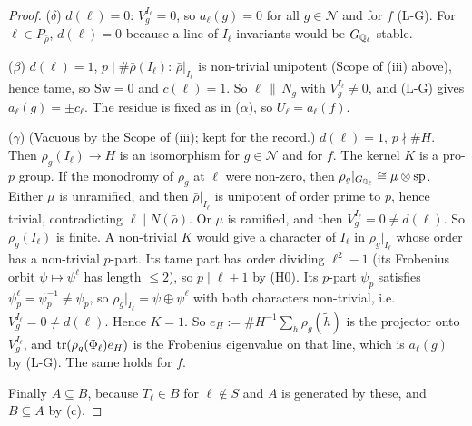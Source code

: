 \begin{proof}
($\delta$) $d(\ell)=0$: $V_g^{I_\ell}=0$, so $a_\ell(g)=0$ for all $g\in\mathcal N$ and for $f$ (L-G). For $\ell\in P_{\bar\rho}$, $d(\ell)=0$ because a line of
$I_\ell$-invariants would be $G_{\mathbb{Q}_\ell}$-stable.

($\beta$) $d(\ell)=1$, $p\mid\#\bar\rho(I_\ell)$: $\bar\rho|_{I_\ell}$ is non-trivial unipotent (Scope of (iii) above), hence tame, so $\mathrm{Sw}=0$ and $c(\ell)=1$. So $\ell\,\|\,N_g$
with $V_g^{I_\ell}\ne0$, and (L-G) gives $a_\ell(g)=\pm c_\ell$. The residue is fixed as in ($\alpha$), so $U_\ell=a_\ell(f)$.

($\gamma$) (Vacuous by the Scope of (iii); kept for the record.) $d(\ell)=1$, $p\nmid\#H$. Then $\rho_g(I_\ell)\to H$ is an isomorphism for $g\in\mathcal N$ and for $f$. The kernel $K$ is a
pro-$p$ group. If the monodromy of $\rho_g$ at $\ell$ were non-zero, then $\rho_g|_{G_{\mathbb{Q}_\ell}}\cong\mu\otimes\mathrm{sp}$. Either $\mu$ is
unramified, and then $\bar\rho|_{I_\ell}$ is unipotent of order prime to $p$, hence trivial, contradicting $\ell\mid N(\bar\rho)$. Or $\mu$ is
ramified, and then $V_g^{I_\ell}=0\ne d(\ell)$. So $\rho_g(I_\ell)$ is finite. A non-trivial $K$ would give a character of $I_\ell$ in
$\rho_g|_{I_\ell}$ whose order has a non-trivial $p$-part. Its tame part has order dividing $\ell^2-1$ (its Frobenius orbit $\psi\mapsto\psi^\ell$
has length $\le2$), so $p\mid\ell+1$ by (H0). Its $p$-part $\psi_p$ satisfies $\psi_p^\ell=\psi_p^{-1}\ne\psi_p$, so
$\rho_g|_{I_\ell}=\psi\oplus\psi^\ell$ with both characters non-trivial, i.e.\ $V_g^{I_\ell}=0\ne d(\ell)$. Hence $K=1$. So
$e_H:=\#H^{-1}\sum_h\rho_g(\tilde h)$ is the projector onto $V_g^{I_\ell}$, and $\operatorname{tr}(\rho_g(\Phi_\ell)e_H)$ is the Frobenius eigenvalue on that
line, which is $a_\ell(g)$ by (L-G). The same holds for $f$.

Finally $A\subseteq B$, because $T_\ell\in B$ for $\ell\notin S$ and $A$ is generated by these, and $B\subseteq A$ by (c).
\end{proof}

